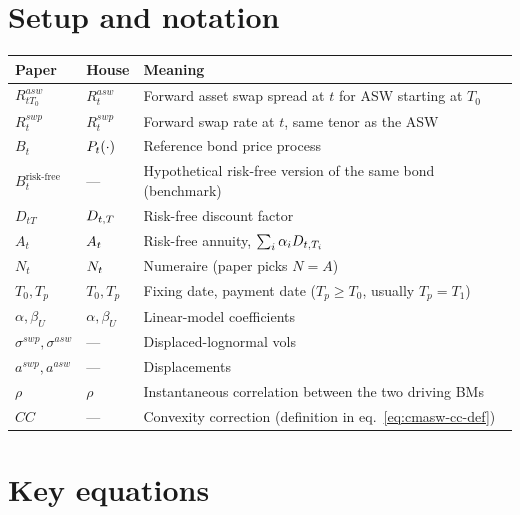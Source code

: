 \documentclass[11pt,a4paper]{article}
\begin{document}
\section{Setup and notation}

\begin{tabular}{@{}p{3cm}p{3.5cm}p{8.5cm}@{}}
\toprule
Paper                   & House                        & Meaning \\
\midrule
$R^{asw}_{t T_0}$       & $R^{asw}_t$                  & Forward asset swap spread at $t$ for ASW starting at $T_0$ \\
$R^{swp}_t$             & $R^{swp}_t$                  & Forward swap rate at $t$, same tenor as the ASW \\
$B_t$                   & $P_{t}(\cdot)$            & Reference bond price process \\
$B^{\text{risk-free}}_t$ & ---                         & Hypothetical risk-free version of the same bond (benchmark) \\
$D_{tT}$                & $D_{t,T}$                & Risk-free discount factor \\
$A_t$                   & $A_{t}$                    & Risk-free annuity, $\sum_{i} \alpha_i D_{t,T_i}$ \\
$N_t$                   & $N_{t}$                  & Numeraire (paper picks $N = A$) \\
$T_0, T_p$              & $T_0, T_p$                   & Fixing date, payment date ($T_p \ge T_0$, usually $T_p = T_1$) \\
$\alpha, \beta_U$       & $\alpha, \beta_U$            & Linear-model coefficients \\
$\sigma^{swp}, \sigma^{asw}$ & ---                     & Displaced-lognormal vols \\
$a^{swp}, a^{asw}$      & ---                          & Displacements \\
$\rho$                  & $\rho$                       & Instantaneous correlation between the two driving BMs \\
$CC$                    & ---                          & Convexity correction (definition in eq.~\ref{eq:cmasw-cc-def}) \\
\bottomrule
\end{tabular}

\section{Key equations}
\end{document}
